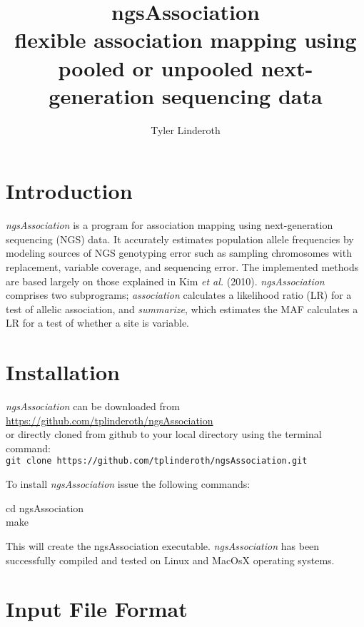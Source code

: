 \documentclass[12pt]{article}
\title{ngsAssociation\\flexible association mapping using pooled or unpooled next-generation sequencing data}
\author{Tyler Linderoth}
\date{}
\newenvironment{codeblock}{ \begin{framed}\ttfamily}{ \end{framed} }
\begin{document}
\maketitle

\tableofcontents
\newpage

\section{Introduction}
\textit{ngsAssociation} is a program for association mapping using next-generation sequencing (NGS) data. It accurately estimates population allele frequencies by modeling sources of NGS genotyping error such as sampling chromosomes with replacement, variable coverage, and sequencing error. The implemented methods are based largely on those explained in Kim {\it et al.} (2010). \textit{ngsAssociation} comprises two subprograms; \textit{association} calculates a likelihood ratio (LR) for a test of allelic association, and \textit{summarize}, which estimates the MAF calculates a LR for a test of whether a site is variable.

\section{Installation}
\setlength{\parindent}{0cm}
\textit{ngsAssociation} can be downloaded from\\\url{https://github.com/tplinderoth/ngsAssociation}\\or directly cloned from 
github to your local directory using the terminal command:\\
\texttt{git clone https://github.com/tplinderoth/ngsAssociation.git}

\vspace{5mm}

To install \textit{ngsAssociation} issue the following commands:

\begin{codeblock}
cd ngsAssociation\\
make
\end{codeblock}

This will create the ngsAssociation executable. \textit{ngsAssociation} has been successfully compiled and tested on Linux and MacOsX operating systems.

\section{Input File Format}
\end{document}
